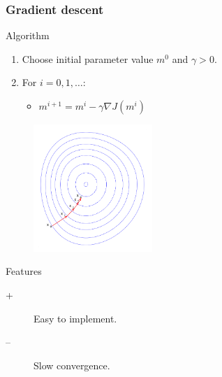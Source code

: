 \begin{frame}
\frametitle{Gradient descent}
\begin{block}{Algorithm}
\begin{enumerate}
    \item Choose initial parameter value $m^0$ and $\gamma >0$.
    \item For $i = 0, 1, \dots$:
    \begin{itemize}
        \item $m^{i+1} = m^i -\gamma \nabla J(m^i)$
    \end{itemize}
\end{enumerate}
\end{block}

\begin{figure}
\begin{center}
    \hfill \includegraphics[width=0.4\textwidth]{png/gradient_descent} 
\end{center}
\end{figure}
\vspace{-2cm}
\begin{block}{Features}
\begin{description}
    \item[+] Easy to implement.
    \item[--] Slow convergence.
\end{description}
\end{block}
\end{frame}

